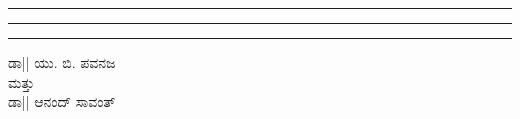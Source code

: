 \documentclass[16pt]{book}
\begin{document}
\begin{titlepage} %
	
	\centering %
	
	
	\rule{\textwidth}{1pt} %
	
	\vspace{2pt}\vspace{-\baselineskip} %
	
	\rule{\textwidth}{0.4pt} %
	
	\vspace{0.1\textheight} %
	
	
	\textcolor{red}{ %
		{\Huge\textbf{\color{blue}{ಕನ್ನಡದಲ್ಲಿ ಸ್ಕ್ರಾಚ್ ಪ್ರೋಗ್ರಾಮ್ಮಿಂಗ್}}
}
}
	
	\vspace{0.025\textheight} %
	
	\rule{0.3\textwidth}{0.4pt} %
	
	\vspace{0.1\textheight} %
	
	\begin{center}
	{\Large \textsc{ಡಾ|| ಯು. ಬಿ. ಪವನಜ}}\\
	ಮತ್ತು\\
	{\Large \textsc{ಡಾ|| ಆನಂದ್ ಸಾವಂತ್}} %
	\end{center}
	

\end{titlepage}
\end{document}
